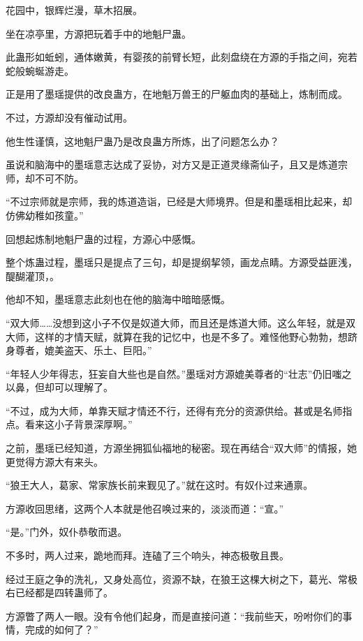 
\begin{this_body}



花园中，银辉烂漫，草木招展。

坐在凉亭里，方源把玩着手中的地魁尸蛊。

此蛊形如蚯蚓，通体嫩黄，有婴孩的前臂长短，此刻盘绕在方源的手指之间，宛若蛇般蜿蜒游走。

正是用了墨瑶提供的改良蛊方，在地魁万兽王的尸躯血肉的基础上，炼制而成。

不过，方源却没有催动试用。

他生性谨慎，这地魁尸蛊乃是改良蛊方所炼，出了问题怎么办？

虽说和脑海中的墨瑶意志达成了妥协，对方又是正道灵缘斋仙子，且又是炼道宗师，却不可不防。

“不过宗师就是宗师，我的炼道造诣，已经是大师境界。但是和墨瑶相比起来，却仿佛幼稚如孩童。”

回想起炼制地魁尸蛊的过程，方源心中感慨。

整个炼蛊过程，墨瑶只是提点了三句，却是提纲挈领，画龙点睛。方源受益匪浅，醍醐灌顶，。

他却不知，墨瑶意志此刻也在他的脑海中暗暗感慨。

“双大师……没想到这小子不仅是奴道大师，而且还是炼道大师。这么年轻，就是双大师，这样的才情天赋，就算在我的记忆中，也是不多了。难怪他野心勃勃，想跻身尊者，媲美盗天、乐土、巨阳。”

“年轻人少年得志，狂妄自大些也是自然。”墨瑶对方源媲美尊者的“壮志”仍旧嗤之以鼻，但却可以理解了。

“不过，成为大师，单靠天赋才情还不行，还得有充分的资源供给。甚或是名师指点。看来这小子背景深厚啊。”

之前，墨瑶已经知道，方源坐拥狐仙福地的秘密。现在再结合“双大师”的情报，她更觉得方源大有来头。

“狼王大人，葛家、常家族长前来觐见了。”就在这时。有奴仆过来通禀。

方源收回思绪，这两个人本就是他召唤过来的，淡淡而道：“宣。”

“是。”门外，奴仆恭敬而退。

不多时，两人过来，跪地而拜。连磕了三个响头，神态极敬且畏。

经过王庭之争的洗礼，又身处高位，资源不缺，在狼王这棵大树之下，葛光、常极右已经都是四转蛊师了。

方源瞥了两人一眼。没有令他们起身，而是直接问道：“我前些天，吩咐你们的事情，完成的如何了？”


\end{this_body}
